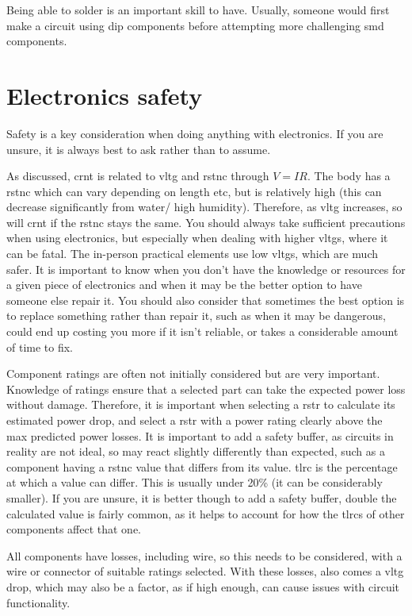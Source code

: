 \documentclass[a4paper,11pt]{report}
\begin{document}
Being able to solder is an important skill to have. Usually, someone would first make a circuit using \gls{dip} components before attempting more challenging \gls{smd} components.

\pagebreak

\section{Electronics safety}

Safety is a key consideration when doing anything with electronics. If you are unsure, it is always best to ask rather than to assume.

As discussed, \gls{crnt} is related to \gls{vltg} and \gls{rstnc} through $V=IR$. The body has a \gls{rstnc} which can vary depending on length etc, but is relatively high (this can decrease significantly from water/ high humidity). Therefore, as \gls{vltg} increases, so will \gls{crnt} if the \gls{rstnc} stays the same. You should always take sufficient precautions when using electronics, but especially when dealing with higher \gls{vltg}s, where it can be fatal. The in-person practical elements use low \gls{vltg}s, which are much safer. It is important to know when you don't have the knowledge or resources for a given piece of electronics and when it may be the better option to have someone else repair it. You should also consider that sometimes the best option is to replace something rather than repair it, such as when it may be dangerous, could end up costing you more if it isn't reliable, or takes a considerable amount of time to fix.

Component ratings are often not initially considered but are very important. Knowledge of ratings ensure that a selected part can take the expected power loss without damage. Therefore, it is important when selecting a \gls{rstr} to calculate its estimated power drop, and select a \gls{rstr} with a power rating clearly above the max predicted power losses. It is important to add a safety buffer, as circuits in reality are not ideal, so may react slightly differently than expected, such as a component having a \gls{rstnc} value that differs from its value.
\gls{tlrc} is the percentage at which a value can differ. This is usually under 20\% (it can be considerably smaller). If you are unsure, it is better though to add a safety buffer, double the calculated value is fairly common, as it helps to account for how the \gls{tlrc}s of other components affect that one.

All components have losses, including wire, so this needs to be considered, with a wire or connector of suitable ratings selected. With these losses, also comes a \gls{vltg} drop, which may also be a factor, as if high enough, can cause issues with circuit functionality.
\end{document}
